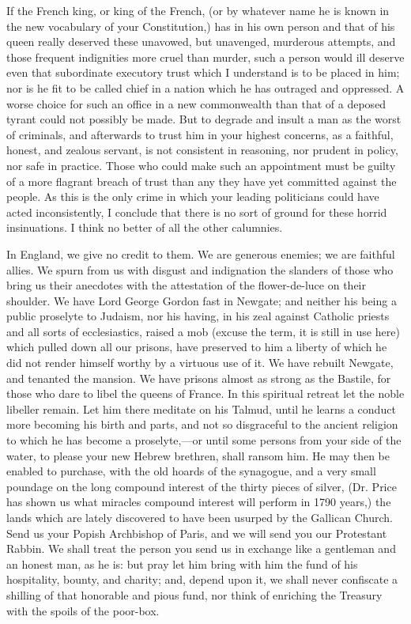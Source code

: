If the French king, or king of the French, (or by whatever name he is known in the new vocabulary of your Constitution,) has in his own person and that of his queen really deserved these unavowed, but unavenged, murderous attempts, and those frequent indignities more cruel than murder, such a person would ill deserve even that subordinate executory trust which I understand is to be placed in him; nor is he fit to be called chief in a nation which he has outraged and oppressed. A worse choice for such an office in a new commonwealth than that of a deposed tyrant could not possibly be made. But to degrade and insult a man as the worst of criminals, and afterwards to trust him in your highest concerns, as a faithful, honest, and zealous servant, is not consistent in reasoning, nor prudent in policy, nor safe in practice. Those who could make such an appointment must be guilty of a more flagrant breach of trust than any they have yet committed against the people. As this is the only crime in which your leading politicians could have acted inconsistently, I conclude that there is no sort of ground for these horrid insinuations. I think no better of all the other calumnies.

In England, we give no credit to them. We are generous enemies; we are faithful allies. We spurn from us with disgust and indignation the slanders of those who bring us their anecdotes with the attestation of the flower-de-luce on their shoulder. We have Lord George Gordon fast in Newgate; and neither his being a public proselyte to Judaism, nor his having, in his zeal against Catholic priests and all sorts of ecclesiastics, raised a mob (excuse the term, it is still in use here) which pulled down all our prisons, have preserved to him a liberty of which he did not render himself worthy by a virtuous use of it. We have rebuilt Newgate, and tenanted the mansion. We have prisons almost as strong as the Bastile, for those who dare to libel the queens of France. In this spiritual retreat let the noble libeller remain. Let him there meditate on his Talmud, until he learns a conduct more becoming his birth and parts, and not so disgraceful to the ancient religion to which he has become a proselyte,—or until some persons from your side of the water, to please your new Hebrew brethren, shall ransom him. He may then be enabled to purchase, with the old hoards of the synagogue, and a very small poundage on the long compound interest of the thirty pieces of silver, (Dr. Price has shown us what miracles compound interest will perform in 1790 years,) the lands which are lately discovered to have been usurped by the Gallican Church. Send us your Popish Archbishop of Paris, and we will send you our Protestant Rabbin. We shall treat the person you send us in exchange like a gentleman and an honest man, as he is: but pray let him bring with him the fund of his hospitality, bounty, and charity; and, depend upon it, we shall never confiscate a shilling of that honorable and pious fund, nor think of enriching the Treasury with the spoils of the poor-box.

